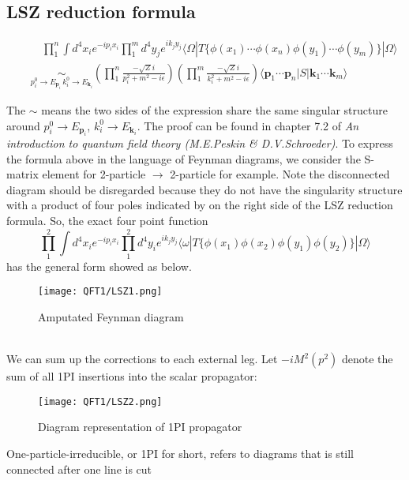 \subsection{LSZ reduction formula}
\begin{newthem}
\begin{eqnarray}
&& \quad \prod_1^n \int d^4 x_i e^{-ip_ix_i} \prod_1^m d^4 y_j e^{ik_jy_j} \langle \Omega | T \{\phi(x_1) \cdots \phi(x_n) \phi(y_1) \cdots \phi(y_m)\} | \Omega \rangle \nonumber \\
&& \underset{ p_i^0 \to E_{\bm{p}_i}\, k_i^0 \to E_{\bm{k}_i}}{\sim}  \left( \prod_1^n \frac{-\sqrt{Z} i}{p_i^2 + m^2 -i\epsilon} \right) \left( \prod_1^m \frac{-\sqrt{Z} i}{k_i^2 + m^2 -i\epsilon} \right) \langle \bm{p}_1 \cdots \bm{p}_n | S | \bm{k}_1 \cdots \bm{k}_m \rangle \nonumber
\end{eqnarray}
\end{newthem}
\noindent
The $\sim$ means the two sides of the expression share the same singular structure around $p_i^0 \to E_{\bm{p}_i}$, $k_i^0 \to E_{\bm{k}_i}$.
The proof can be found in chapter 7.2 of \emph{An introduction to quantum field theory (M.E.Peskin \& D.V.Schroeder)}.
To express the formula above in the language of Feynman diagrams, we consider the S-matrix element for 2-particle $\to$ 2-particle for example. Note the disconnected diagram should be disregarded because they do not have the singularity structure with a product of four poles indicated by on the right side of the LSZ reduction formula. So, the exact four point function
\[\prod_1^2 \int d^4 x_i e^{-ip_ix_i} \prod_1^2 d^4 y_i e^{ik_jy_j} \langle \omega | T \{\phi(x_1)\phi(x_2)\phi(y_1) \phi(y_2)\} | \Omega \rangle \]
has the general form showed as below.
\begin{figure}[!h]
\centering
\texttt{[image: QFT1/LSZ1.png]}
\caption{Amputated Feynman diagram}
\end{figure}\\
We can sum up the corrections to each external leg. Let $-iM^2(p^2)$ denote the sum of all 1PI insertions into the scalar propagator:
\begin{figure}[!h]
\centering
\texttt{[image: QFT1/LSZ2.png]}
\caption{Diagram representation of 1PI propagator}
\end{figure}
\begin{note}
One-particle-irreducible, or 1PI for short, refers to diagrams that is still connected after one line is cut
\end{note}
